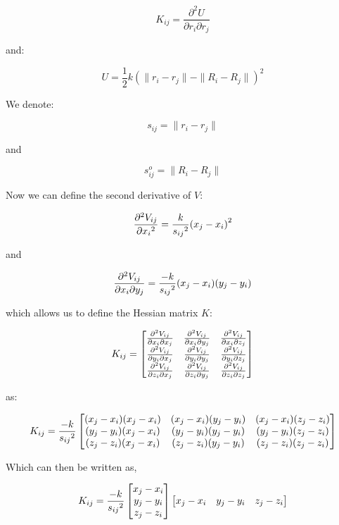 \documentclass[
]{article}
\begin{document}
\[K_{ij} = \frac{\partial^2 U}{\partial r_{i} \partial r_{j}}\]

and:

\[U = \frac{1}{2} k(\|r_i - r_j\|-\|R_i-R_j\|)^2\]

We denote:

\[s_{ij} = \|r_i-r_j\|\]

and

\[s_{ij}^o = \|R_i-R_j\|\]

Now we can define the second derivative of \(V\):

\[{\partial^2 V_{ij}\over\partial{x_i}^2} = {k\over {s_{ij}}^2} {(x_j - x_i)}^2\]

and

\[{\partial^2 V_{ij}\over\partial x_i\partial y_j} = {-k\over {s_{ij}}^2} {(x_j
- x_i)}{(y_j-y_i)}\]

which allows us to define the Hessian matrix \(K\):

\[%
K_{ij} = \begin{bmatrix}  {\partial^2 V_{ij}\over\partial x_i\partial x_j} &
{\partial^2 V_{ij}\over\partial x_i\partial y_j} & {\partial^2
V_{ij}\over\partial x_i\partial z_j} \\ {\partial^2 V_{ij}\over\partial
y_i\partial x_j} & {\partial^2 V_{ij}\over\partial y_i\partial y_j} &
{\partial^2 V_{ij}\over\partial y_i\partial z_j} \\ {\partial^2
V_{ij}\over\partial z_i\partial x_j} & {\partial^2 V_{ij}\over\partial
z_i\partial y_j} & {\partial^2 V_{ij}\over\partial z_i\partial z_j}\end{bmatrix} %
\]

as:

\[%
K_{ij} = {-k\over {s_{ij}}^2} \begin{bmatrix} {(x_j - x_i)(x_j - x_i)} & {(x_j
- x_i)(y_j - y_i)} & {(x_j - x_i)(z_j - z_i)} \\ {(y_j - y_i)(x_j - x_i)} &
{(y_j - y_i)(y_j - y_i)} & {(y_j - y_i)(z_j - z_i)} \\{(z_j - z_i)(x_j - x_i)} &
{(z_j - z_i)(y_j - y_i)} & {(z_j - z_i)(z_j - z_i)} \end{bmatrix} %
\]

Which can then be written as,

\[%
K_{ij} = {-k\over {s_{ij}}^2} \begin{bmatrix} x_j - x_i\\y_j - y_i\\z_j-z_i
\end{bmatrix} \begin{bmatrix} x_j - x_i & y_j - y_i & z_j-z_i \end{bmatrix} %
\]
\end{document}
